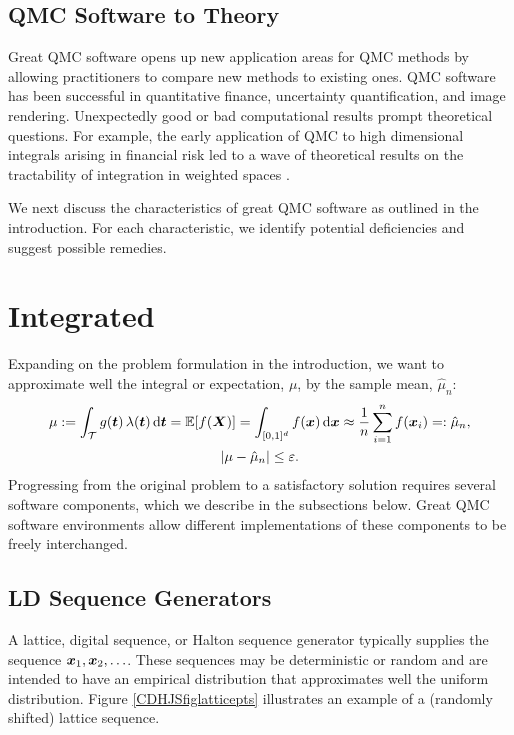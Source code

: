 \documentclass[graybox]{svmult}
\begin{document}
\subsection{QMC Software to Theory}

Great QMC software opens up new application areas for QMC methods by allowing practitioners to compare new methods to existing ones.  QMC software has been successful in quantitative finance, uncertainty quantification, and image rendering. Unexpectedly good or bad computational results prompt theoretical questions.  For example, the early application of QMC to high dimensional integrals arising in financial risk \cite{PasTra95} led to a wave of theoretical results on the tractability of integration in weighted spaces \cite{Woz99a,DicEtal14a,NovWoz10a}.

\bigskip

We next discuss the characteristics of great QMC software as outlined in the introduction.  For each characteristic, we identify potential deficiencies and suggest possible remedies.

\section{Integrated} \label{CDHJS_sec:integrated}

Expanding on the problem formulation in the introduction, we want to approximate well the integral or expectation, $\mu$, by the sample mean, $\hat{\mu}_n$:
\begin{gather}
\label{eq:cubSummary}
	\mu : = \int_\calT g(\bst) \, \lambda(\bst) \, \D \bst  = \bbE[f(\bsX)] = \int_{[0,1]^d} f(\bsx)  \, \D \bsx \approx \frac 1n \sum_{i=1}^{n} f(\bsx_i) =: \hat{\mu}_n, \\
 \label{CDHJS_eq:error_tol}
 \abs{\mu - \hat{\mu}_n} \le \varepsilon.
\end{gather}
Progressing from the original problem to a satisfactory solution requires several software components, which we describe in the subsections below.  Great QMC software environments allow different implementations of these components to be freely interchanged.

\subsection{LD Sequence Generators} A lattice, digital sequence, or Halton sequence generator typically supplies the sequence ${\boldsymbol{x}}_1, {\boldsymbol{x}}_2, \ldots$.  These sequences may be deterministic or random and are intended to have an empirical distribution that approximates well the uniform distribution.  Figure \ref{CDHJSfiglatticepts} illustrates an example of a (randomly shifted) lattice sequence.
\end{document}
